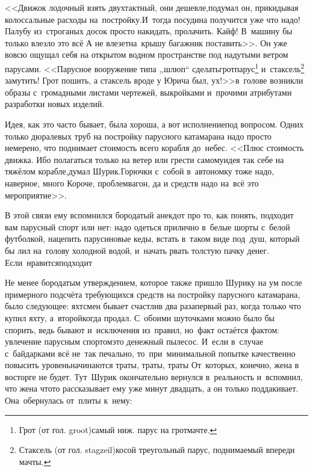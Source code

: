 {<<Движок лодочный взять двухтактный, они дешевле,\mdash подумал он, прикидывая колоссальные расходы на~постройку.\mdash И~тогда посудина получится уже что надо! Палубу из~строганых досок просто накидать, пролачить. Кайф! В~машину бы только влезло это всё\myldots{} А не влезет\mdash на~крышу багажник поставить>>. Он уже вовсю ощущал себя на открытом водном пространстве под надутыми ветром парусами. <<Парусное вооружение типа ,,шлюп`` сделать\mdash грот\sdash парус\footnote{Грот (от гол. groot)\mdash самый ниж. парус на грот\sdash мачте.} и~стаксель\footnote{Стаксель (от гол. stagzeil)\mdash косой треугольный парус, поднимаемый впереди мачты.} замутить! Грот пошить, а стаксель вроде у Юрича был, ух!>>\mdash в~голове возникли образы с~громадными листами чертежей, выкройками и~прочими атрибутами разработки новых изделий.

Идея, как это часто бывает, была хороша, а вот исполнение\mdash под вопросом. Одних только дюралевых труб на постройку парусного катамарана надо просто немерено, что поднимает стоимость всего корабля до~небес. <<Плюс стоимость движка. Ибо полагаться только на ветер или грести самому\mdash идея так себе на тяжёлом корабле,\mdash думал Шурик.\mdash Горючки с~собой в~автономку тоже надо, наверное, много\myldots{} Короче, проблем\mdash вагон, да и средств надо на~всё это мероприятие>>. 

В этой связи ему вспомнился бородатый анекдот про то, как понять, подходит вам парусный спорт или нет: надо одеться прилично в~белые шорты с~белой футболкой, нацепить парусиновые кеды, встать в~таком виде под~душ, который бы лил на~голову холодной водой, и~начать рвать толстую пачку денег. Если~нравится\mdash подходит\myldots{}

Не менее бородатым утверждением, которое также пришло Шурику на ум после примерного подсчёта требующихся средств на постройку парусного катамарана, было следующее: яхтсмен бывает счастлив два раза\mdash первый раз, когда только что купил яхту, а~второй\mdash когда продал. С~обоими шуточками можно было бы спорить, ведь бывают и~исключения из~правил, но~факт остаётся фактом: увлечение парусным спортом\mdash это денежный пылесос. И~если в~случае с~байдарками всё не~так печально, то~при~минимальной попытке качественно повысить уровень\mdash начинаются траты, траты, траты\myldots{} От~которых, конечно, жена в восторге не будет. Тут~Шурик окончательно вернулся в~реальность и~вспомнил, что жена что\sdash то рассказывает ему уже минут двадцать, а он только поддакивает. Она~обернулась от~плиты к~нему:

}

